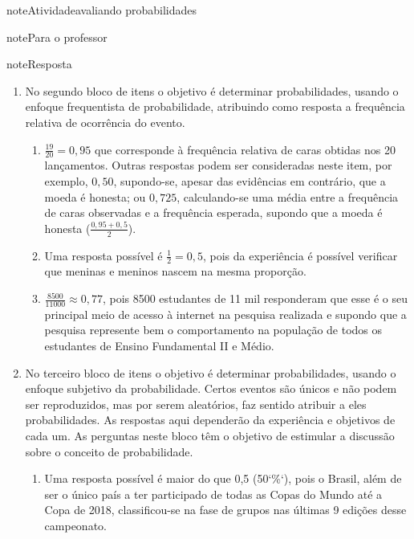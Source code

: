 \begin{sphinxadmonition}{note}{Atividade}{avaliando probabilidades}
\begin{sphinxadmonition}{note}{Para o professor}
\begin{sphinxadmonition}{note}{Resposta}
\begin{enumerate}
\begin{enumerate}
\item {} 
\(\frac{4}{10}=0,4=40\%\), pois são 10 casas e quatro delas têm mais de 4 moradores.

\end{enumerate}
\begin{enumerate}
\setcounter{enumi}{2}
\item {} 
\(\frac{1}{4}=0,25=25\%\), pois a área da região pintada corresponde a um quarto da área do círculo, isto é, a um setor circular de ângulo reto.

\end{enumerate}

\item {} 
No segundo bloco de itens o objetivo é determinar probabilidades, usando o enfoque frequentista de probabilidade, atribuindo como resposta a frequência relativa de ocorrência do evento.
\begin{enumerate}
\item {} 
\(\frac{19}{20}=0,95\) que corresponde à frequência relativa de caras obtidas nos 20 lançamentos. Outras respostas podem ser consideradas neste item, por exemplo, \(0,50\), supondo-se, apesar das evidências em contrário, que a moeda é honesta; ou \(0,725\), calculando-se uma média entre a frequência de caras observadas e a frequência esperada, supondo que a moeda é honesta (\(\frac{0,95+0,5}{2}\)).

\item {} 
Uma resposta possível é \(\frac{1}{2}=0,5\), pois da experiência é possível verificar que meninas e meninos nascem na mesma proporção.

\item {} 
\(\frac{8500}{11000}\approx 0,77\), pois 8500 estudantes de 11 mil responderam que esse é o seu principal meio de acesso à internet na pesquisa realizada e supondo que a pesquisa represente bem o comportamento na população de todos os estudantes de Ensino Fundamental II e Médio.

\end{enumerate}

\item {} 
No terceiro bloco de itens o objetivo é determinar probabilidades, usando o enfoque subjetivo da probabilidade. Certos eventos são únicos e não podem ser reproduzidos, mas por serem aleatórios, faz sentido atribuir a eles probabilidades. As respostas aqui dependerão da experiência e objetivos de cada um. As perguntas neste bloco têm o objetivo de estimular a discussão sobre o conceito de probabilidade.
\begin{enumerate}
\item {} 
Uma resposta possível é maior do que 0,5 (50{}`\%{}`), pois o Brasil, além de ser o único país a ter participado de todas as Copas do Mundo até a Copa de 2018, classificou-se na fase de grupos nas últimas 9 edições desse campeonato.


\end{enumerate}
\end{enumerate}
\end{sphinxadmonition}
\end{sphinxadmonition}
\end{sphinxadmonition}
